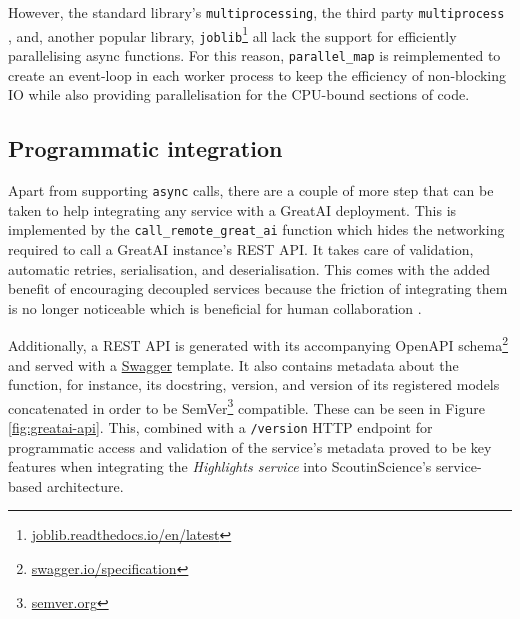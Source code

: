However, the standard library's \texttt{multiprocessing}, the third party \texttt{multiprocess} \cite{mckerns2012building}, and, another popular library, \texttt{joblib}\footnote{\href{https://joblib.readthedocs.io/en/latest/}{joblib.readthedocs.io/en/latest}} all lack the support for efficiently parallelising async functions. For this reason, \texttt{parallel\_map} is reimplemented to create an event-loop in each worker process to keep the efficiency of non-blocking IO while also providing parallelisation for the CPU-bound sections of code.

\subsection{Programmatic integration}

Apart from supporting \texttt{async} calls, there are a couple of more step that can be taken to help integrating any service with a GreatAI deployment. This is implemented by the \texttt{call\_remote\_great\_ai} function which hides the networking required to call a GreatAI instance's REST API. It takes care of validation, automatic retries, serialisation, and deserialisation. This comes with the added benefit of encouraging decoupled services because the friction of integrating them is no longer noticeable which is beneficial for human collaboration \cite{hasselbring2002component}.

Additionally, a REST API is generated with its accompanying OpenAPI schema\footnote{\href{https://swagger.io/specification}{swagger.io/specification}} and served with a \href{https://swagger.io/}{Swagger} template. It also contains metadata about the function, for instance, its docstring, version, and version of its registered models concatenated in order to be SemVer\footnote{\href{https://semver.org/}{semver.org}} compatible. These can be seen in Figure \ref{fig:greatai-api}. This, combined with a \texttt{/version} HTTP endpoint for programmatic access and validation of the service's metadata proved to be key features when integrating the \textit{Highlights service} into ScoutinScience's service-based architecture.

